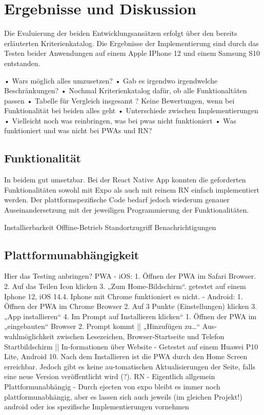 \chapter{Ergebnisse und Diskussion}\label{ch:results}
Die Evaluierung der beiden Entwicklungsansätzen erfolgt über den bereits erläuterten Kriterienkatalog. Die Ergebnisse der Implementierung sind durch das Testen beider Anwendungen auf einem Apple IPhone 12 und einem Samsung S10 entstanden.

•	Wars möglich alles umzusetzen?
•	Gab es irgendwo irgendwelche Beschränkungen?
•	Nochmal Kriterienkatalog dafür, ob alle Funktionaltäten passen
•	Tabelle für Vergleich insgesamt	?
Keine Bewertungen, wenn bei Funktionalität bei beiden alles geht
•	Unterschiede zwischen Implementierungen
•	Vielleicht noch was reinbringen, was bei pwas nicht funktioniert
•	Was funktioniert und was nicht bei PWAs und RN? 


\section{Funktionalität}
In beidem gut umsetzbar. Bei der React Native App konnten die geforderten Funktionalitäten sowohl mit Expo als auch mit reinem RN einfach implementiert werden. Der plattformspezifische Code bedarf jedoch wiederum genauer Auseinandersetzung mit der jeweiligen Programmierung der Funktionalitäten.

Installierbarkeit
Offline-Betrieb
Standortzugriff
Benachrichtigungen



\section{Plattformunabhängigkeit}
Hier das Testing anbringen?
PWA
-	iOS: 1. Öffnen der PWA im Safari Browser. 2. Auf das Teilen Icon klicken 3. „Zum Home-Bildschirm“. getestet auf einem Iphone 12, iOS 14.4. Iphone mit Chrome funktioniert es nicht.
-	Android: 1. Öffnen der PWA im Chrome Browser 2. Auf 3 Punkte (Einstellungen) klicken 3. „App installieren“ 4. Im Prompt auf Installieren klicken“
1. Öffnen der PWA im „eingebauten“ Browser 2. Prompt kommt || „Hinzufügen zu…“ Aus-wahlmöglichkeit zwischen Lesezeichen, Browser-Startseite und Telefon Startbildschirm || In-formationen über Website 
-	Getestet auf einem Huawei P10 Lite, Android 10.	
Nach dem Installieren ist die PWA durch den Home Screen erreichbar. Jedoch gibt es keine au-tomatischen Aktualisierungen der Seite, falls eine neue Version veröffentlicht wird (?).
RN
-	Eigentlich allgemein Plattformunabhängig
-	Durch ejecten von expo bleibt es immer noch plattformunabhängig, aber es lassen sich auch jeweils (im gleichen Projekt!) android oder ios spezifische Implementierungen vornehmen

